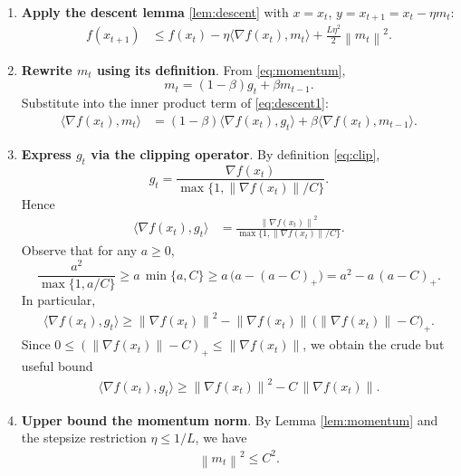 \documentclass{article}
\newcommand{\norm}[1]{\left\lVert #1 \right\rVert}
\begin{document}
\begin{enumerate}
    \item[Step 1.] \textbf{Apply the descent lemma} \eqref{lem:descent} with $x=x_t$, $y=x_{t+1}=x_t-\eta m_t$:
    \begin{align}
        f(x_{t+1})
        &\le f(x_t) - \eta\langle\nabla f(x_t),m_t\rangle
           + \frac{L\eta^2}{2}\norm{m_t}^2 .
        \label{eq:descent1}
    \end{align}
    \item[Step 2.] \textbf{Rewrite $m_t$ using its definition}.  From \eqref{eq:momentum},
    \[
        m_t = (1-\beta)g_t + \beta m_{t-1}.
    \]
    Substitute into the inner product term of \eqref{eq:descent1}:
    \begin{align}
        \langle\nabla f(x_t),m_t\rangle
        &= (1-\beta)\langle\nabla f(x_t),g_t\rangle
           + \beta\langle\nabla f(x_t),m_{t-1}\rangle .
        \label{eq:inner}
    \end{align}
    \item[Step 3.] \textbf{Express $g_t$ via the clipping operator}.  
    By definition \eqref{eq:clip},
    \[
        g_t = \frac{\nabla f(x_t)}{\max\{1,\norm{\nabla f(x_t)}/C\}} .
    \]
    Hence
    \begin{align}
        \langle\nabla f(x_t),g_t\rangle
        &= \frac{\norm{\nabla f(x_t)}^2}{\max\{1,\norm{\nabla f(x_t)}/C\}} .
        \label{eq:clipinner}
    \end{align}
    Observe that for any $a\ge0$,
    \[
        \frac{a^2}{\max\{1,a/C\}} \ge a\,\min\{a,C\}
        \ge a\,\bigl(a - (a-C)_+\bigr) = a^2 - a\,(a-C)_+ .
    \]
    In particular,
    \begin{align}
        \langle\nabla f(x_t),g_t\rangle
        \ge \norm{\nabla f(x_t)}^2 - \norm{\nabla f(x_t)}\,
               \bigl(\norm{\nabla f(x_t)}-C\bigr)_+ .
        \label{eq:clipbound}
    \end{align}
    Since $0\le (\norm{\nabla f(x_t)}-C)_+ \le \norm{\nabla f(x_t)}$, we obtain the crude but useful bound
    \begin{align}
        \langle\nabla f(x_t),g_t\rangle \ge
        \norm{\nabla f(x_t)}^2 - C\,\norm{\nabla f(x_t)} .
        \label{eq:clipbound2}
    \end{align}
    \item[Step 4.] \textbf{Upper bound the momentum norm}.  
    By Lemma \ref{lem:momentum} and the stepsize restriction $\eta\le 1/L$, we have
    \begin{align}
        \norm{m_t}^2 \le C^2 .

\end{align}
\end{enumerate}
\end{document}
